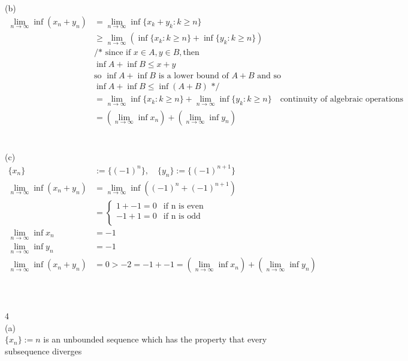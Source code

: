 \documentclass[12pt, border = 4pt, multi]{article} %
\begin{document}
\\
\\
(b)
\begin{align*}
\lim_{n \rightarrow \infty} \inf (x_n + y_n) &= \lim_{n \rightarrow \infty} \inf\{x_k + y_k: k \geq n\}\\
&\geq \lim_{n \rightarrow \infty} (\inf\{x_k: k \geq n\} + \inf\{y_k: k \geq n\})\\
&\text{/* since if } x \in A, y \in B, \text{then}\\
&\inf A + \inf B \leq x + y\\
&\text{so } \inf A + \inf B \text{ is a lower bound of } A + B \text{ and so}\\
&\inf A + \inf B \leq \inf(A + B) \text{ */}\\
&= \lim_{n \rightarrow \infty} \inf\{x_k: k \geq n\} + \lim_{n \rightarrow \infty} \inf\{y_k: k \geq n\}\quad\text{continuity of algebraic operations}\\
&= \left(\lim_{n \rightarrow \infty} \inf x_n \right) + \left(\lim_{n \rightarrow \infty} \inf y_n \right)
\end{align*}
\\
\\
(c)
\begin{align*}
\{x_n\} &:= \{(-1) ^ n\},\quad\{y_n\} := \{(-1) ^ {n + 1}\}\\
\lim_{n \rightarrow \infty}\inf(x_n + y_n) &= \lim_{n \rightarrow \infty}\inf((-1) ^ n + (-1) ^ {n + 1})\\
&=
\begin{cases}
1 + -1 = 0 & \text{if n is even}\\
-1 + 1 = 0 & \text{if n is odd}\\
\end{cases}\\
\lim_{n \rightarrow \infty}\inf x_n &= -1\\
\lim_{n \rightarrow \infty}\inf y_n &= -1\\
\lim_{n \rightarrow \infty}\inf(x_n + y_n) &= 0 > -2 = -1 + -1 = \left(\lim_{n \rightarrow \infty} \inf x_n \right) + \left(\lim_{n \rightarrow \infty} \inf y_n \right)
\end{align*}
\\
\\
\\
4\\
(a)\\
$\{x_n\} := n$ is an unbounded sequence which has the property that every subsequence diverges\\
\\
\end{document}
